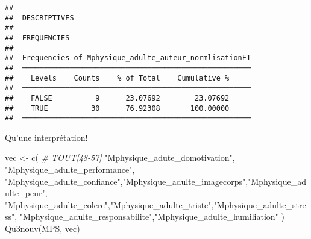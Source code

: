 \documentclass[
]{article}
\newenvironment{Shaded}{\begin{snugshade}}{\end{snugshade}}
\newcommand{\CommentTok}[1]{\textcolor[rgb]{0.56,0.35,0.01}{\textit{#1}}}
\newcommand{\FunctionTok}[1]{\textcolor[rgb]{0.00,0.00,0.00}{#1}}
\newcommand{\NormalTok}[1]{#1}
\newcommand{\OtherTok}[1]{\textcolor[rgb]{0.56,0.35,0.01}{#1}}
\newcommand{\StringTok}[1]{\textcolor[rgb]{0.31,0.60,0.02}{#1}}
\begin{document}
\begin{verbatim}
## 
##  DESCRIPTIVES
## 
##  FREQUENCIES
## 
##  Frequencies of Mphysique_adulte_auteur_normlisationFT 
##  ───────────────────────────────────────────────────── 
##    Levels    Counts    % of Total    Cumulative %   
##  ───────────────────────────────────────────────────── 
##    FALSE          9      23.07692        23.07692   
##    TRUE          30      76.92308       100.00000   
##  ─────────────────────────────────────────────────────
\end{verbatim}

Qu'une interprétation!

\begin{Shaded}
\begin{Highlighting}[]
\NormalTok{vec }\OtherTok{\textless{}{-}} \FunctionTok{c}\NormalTok{(   }\CommentTok{\# TOUT[48{-}57]}
  \StringTok{"Mphysique\_adute\_domotivation"}\NormalTok{,}
  \StringTok{"Mphysique\_adulte\_performance"}\NormalTok{,}
  \StringTok{"Mphysique\_adulte\_confiance"}\NormalTok{,}\StringTok{"Mphysique\_adulte\_imagecorps"}\NormalTok{,}\StringTok{"Mphysique\_adulte\_peur"}\NormalTok{,}
  \StringTok{"Mphysique\_adulte\_colere"}\NormalTok{,}\StringTok{"Mphysique\_adulte\_triste"}\NormalTok{,}\StringTok{"Mphysique\_adulte\_stress"}\NormalTok{,}
  \StringTok{"Mphysique\_adulte\_responsabilite"}\NormalTok{,}\StringTok{"Mphysique\_adulte\_humiliation"}
\NormalTok{     )}
\FunctionTok{Qu3nouv}\NormalTok{(MPS, vec)}
\end{Highlighting}
\end{Shaded}
\end{document}
